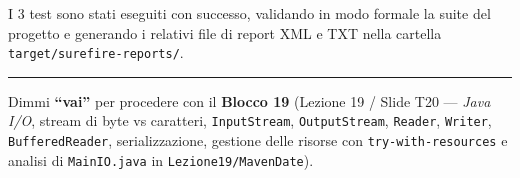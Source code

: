 \documentclass[11pt,a4paper]{article}
\newcommand{\passthrough}[1]{#1}
\begin{document}
I 3 test sono stati eseguiti con successo, validando in modo formale la
suite del progetto e generando i relativi file di report XML e TXT nella
cartella \passthrough{\lstinline!target/surefire-reports/!}.

\begin{center}\rule{0.5\linewidth}{0.5pt}\end{center}

Dimmi \textbf{``vai''} per procedere con il \textbf{Blocco 19} (Lezione
19 / Slide T20 --- \emph{Java I/O}, stream di byte vs caratteri,
\passthrough{\lstinline!InputStream!},
\passthrough{\lstinline!OutputStream!},
\passthrough{\lstinline!Reader!}, \passthrough{\lstinline!Writer!},
\passthrough{\lstinline!BufferedReader!}, serializzazione, gestione
delle risorse con \passthrough{\lstinline!try-with-resources!} e analisi
di \passthrough{\lstinline!MainIO.java!} in
\passthrough{\lstinline!Lezione19/MavenDate!}).
\end{document}
